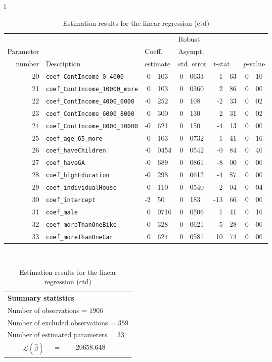\documentclass[12pt,a4paper]{article}
\begin{document}
\begin{table}[htb]
\caption{\label{tab:regression2}Estimation results for the linear
  regression (ctd)}
  \begin{tabular}{l}
\begin{tabular}{rlr@{.}lr@{.}lr@{.}lr@{.}l}
         &                       &   \multicolumn{2}{l}{}    & \multicolumn{2}{l}{Robust}  &     \multicolumn{4}{l}{}   \\
Parameter &                       &   \multicolumn{2}{l}{Coeff.}      & \multicolumn{2}{l}{Asympt.}  &     \multicolumn{4}{l}{}   \\
number &  Description                     &   \multicolumn{2}{l}{estimate}      & \multicolumn{2}{l}{std. error}  &   \multicolumn{2}{l}{$t$-stat}  &   \multicolumn{2}{l}{$p$-value}   \\

\hline

20 & \lstinline$coef_ContIncome_0_4000$ & 0&103 & 0&0633 & 1&63 & 0&10\\
21 & \lstinline$coef_ContIncome_10000_more$ & 0&103 & 0&0360 & 2&86 & 0&00\\
22 & \lstinline$coef_ContIncome_4000_6000$ & -0&252 & 0&108 & -2&33 & 0&02\\
23 & \lstinline$coef_ContIncome_6000_8000$ & 0&300 & 0&130 & 2&31 & 0&02\\
24 & \lstinline$coef_ContIncome_8000_10000$ & -0&621 & 0&150 & -4&13 & 0&00\\
25 & \lstinline$coef_age_65_more$ & 0&103 & 0&0732 & 1&41 & 0&16\\
26 & \lstinline$coef_haveChildren$ & -0&0454 & 0&0542 & -0&84 & 0&40\\
27 & \lstinline$coef_haveGA$ & -0&689 & 0&0861 & -8&00 & 0&00\\
28 & \lstinline$coef_highEducation$ & -0&298 & 0&0612 & -4&87 & 0&00\\
29 & \lstinline$coef_individualHouse$ & -0&110 & 0&0540 & -2&04 & 0&04\\
30 & \lstinline$coef_intercept$ & -2&50 & 0&183 & -13&66 & 0&00\\
31 & \lstinline$coef_male$ & 0&0716 & 0&0506 & 1&41 & 0&16\\
32 & \lstinline$coef_moreThanOneBike$ & -0&328 & 0&0621 & -5&28 & 0&00\\
33 & \lstinline$coef_moreThanOneCar$ & 0&624 & 0&0581 & 10&74 & 0&00\\
\hline
\end{tabular}
\\
\begin{tabular}{rcl}
\multicolumn{3}{l}{\bf Summary statistics}\\
\multicolumn{3}{l}{ Number of observations = $1906$} \\
\multicolumn{3}{l}{ Number of excluded observations = $359$} \\
\multicolumn{3}{l}{ Number of estimated  parameters = $33$} \\
 $\mathcal{L}(\hat{\beta})$ &=& $-20658.648 $  \\
\end{tabular}
  \end{tabular}
\end{table}
\end{document}
